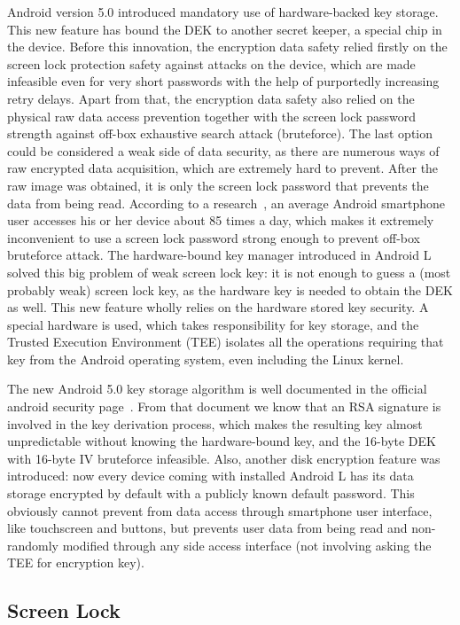 Android version 5.0 introduced mandatory use of hardware-backed key storage. This new feature has bound the DEK to another secret keeper, a special chip in the device. Before this innovation, the encryption data safety relied firstly on the screen lock protection safety against attacks on the device, which are made infeasible even for very short passwords with the help of purportedly increasing retry delays. Apart from that, the encryption data safety also relied on the physical raw data access prevention together with the screen lock password strength against off-box exhaustive search attack (bruteforce). The last option could be considered a weak side of data security, as there are numerous ways of raw encrypted data acquisition, which are extremely hard to prevent. After the raw image was obtained, it is only the screen lock password that prevents the data from being read. According to a  research~\cite{android1}, an average Android smartphone user accesses his or her device about 85 times a day, which makes it extremely inconvenient to use a screen lock password strong enough to prevent off-box bruteforce attack. The hardware-bound key manager introduced in Android L solved this big problem of weak screen lock key: it is not enough to guess a (most probably weak) screen lock key, as the hardware key is needed to obtain the DEK as well. This new feature wholly relies on the hardware stored key security. A special hardware is used, which takes responsibility for key storage, and the Trusted Execution Environment (TEE) isolates all the operations requiring that key from the Android operating system, even including the Linux kernel. 

The new Android 5.0 key storage algorithm is well documented in the official android security page~\cite{android2}. From that document we know that an RSA signature is involved in the key derivation process, which makes the resulting key almost unpredictable without knowing the hardware-bound key, and the 16-byte DEK with 16-byte IV bruteforce infeasible. Also, another disk encryption feature was introduced: now every device coming with installed Android L has its data storage encrypted by default with a publicly known default password. This obviously cannot prevent from data access through smartphone user interface, like touchscreen and buttons, but prevents user data from being read and non-randomly modified through any side access interface (not involving asking the TEE for encryption key).



\subsection{Screen Lock}

